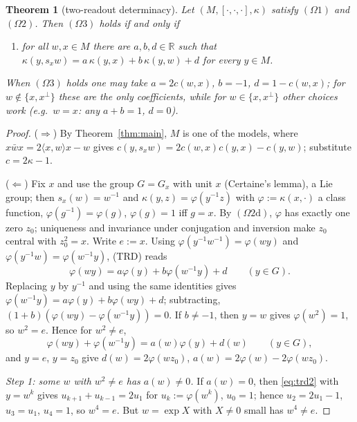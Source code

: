 \documentclass[aps,pra,onecolumn,superscriptaddress,nofootinbib,10pt]{revtex4-2}
\newtheorem{theorem}{Theorem}
\theoremstyle{definition}
\theoremstyle{remark}
\newcommand{\R}{\mathbb{R}}
\newcommand{\ip}[2]{\langle #1,#2\rangle}
\newcommand{\hp}[3]{[#1,#2,#3]}
\begin{document}
\begin{theorem}[two-readout determinacy]\label{thm:trd}
Let $(M,\hp{\cdot}{\cdot}{\cdot},\kappa)$ satisfy $(\Omega1)$ and $(\Omega2)$.  Then $(\Omega3)$ holds if and
only if
\begin{enumerate}[label=(TRD),leftmargin=3.2em]
\item for all $w,x\in M$ there are $a,b,d\in\R$ such that $\kappa(y,s_xw)=a\,\kappa(y,x)+b\,\kappa(y,w)+d$
for every $y\in M$.
\end{enumerate}
When $(\Omega3)$ holds one may take $a=2c(w,x)$, $b=-1$, $d=1-c(w,x)$; for $w\notin\{x,x^\perp\}$ these are the
only coefficients, while for $w\in\{x,x^\perp\}$ other choices work (e.g.\ $w=x$: any $a+b=1$, $d=0$).
\end{theorem}
\begin{proof}
($\Rightarrow$) By Theorem~\ref{thm:main}, $M$ is one of the models, where $x\bar wx=2\ip{x}{w}x-w$
gives $c(y,s_xw)=2c(w,x)c(y,x)-c(y,w)$; substitute $c=2\kappa-1$.

($\Leftarrow$) Fix $x$ and use the group $G=G_x$ with unit $x$ (Certaine's lemma), a Lie group; then
$s_x(w)=w^{-1}$ and $\kappa(y,z)=\varphi(y^{-1}z)$ with $\varphi:=\kappa(x,\cdot)$ a class function,
$\varphi(g^{-1})=\varphi(g)$, $\varphi(g)=1$ iff $g=x$.  By $(\Omega2\mathrm d)$, $\varphi$ has exactly one
zero $z_0$; uniqueness and invariance under conjugation and inversion make $z_0$ central with
$z_0^2=x$.  Write $e:=x$.  Using $\varphi(y^{-1}w^{-1})=\varphi(wy)$ and $\varphi(y^{-1}w)=\varphi(w^{-1}y)$,
(TRD) reads
\begin{equation}\label{eq:trd1}
\varphi(wy)=a\varphi(y)+b\varphi(w^{-1}y)+d\qquad(y\in G).
\end{equation}
Replacing $y$ by $y^{-1}$ and using the same identities gives
$\varphi(w^{-1}y)=a\varphi(y)+b\varphi(wy)+d$; subtracting, $(1+b)(\varphi(wy)-\varphi(w^{-1}y))=0$.  If
$b\ne-1$, then $y=w$ gives $\varphi(w^2)=1$, so $w^2=e$.  Hence for $w^2\ne e$,
\begin{equation}\label{eq:trd2}
\varphi(wy)+\varphi(w^{-1}y)=a(w)\varphi(y)+d(w)\qquad(y\in G),
\end{equation}
and $y=e$, $y=z_0$ give $d(w)=2\varphi(wz_0)$, $a(w)=2\varphi(w)-2\varphi(wz_0)$.

\emph{Step 1: some $w$ with $w^2\ne e$ has $a(w)\ne0$.}  If $a(w)=0$, then \eqref{eq:trd2} with
$y=w^k$ gives $u_{k+1}+u_{k-1}=2u_1$ for $u_k:=\varphi(w^k)$, $u_0=1$; hence $u_2=2u_1-1$, $u_3=u_1$,
$u_4=1$, so $w^4=e$.  But $w=\exp X$ with $X\ne0$ small has $w^4\ne e$.


\end{proof}
\end{document}
